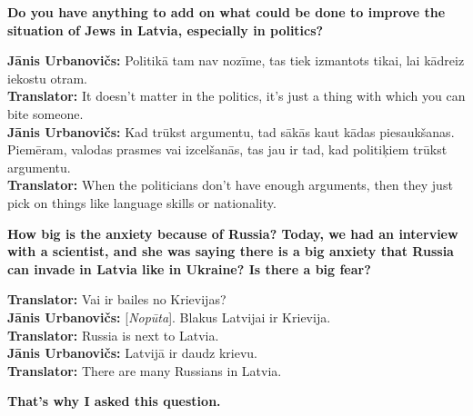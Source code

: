 \textbf{Do you have anything to add on what could be done to improve the situation of Jews in Latvia, especially in politics?}  

\textbf{Jānis Urbanovičs:} Politikā tam nav nozīme, tas tiek izmantots tikai, lai kādreiz iekostu otram.\\  
\textbf{Translator:} It doesn't matter in the politics, it’s just a thing with which you can bite someone.\\
\textbf{Jānis Urbanovičs:} Kad trūkst argumentu, tad sākās kaut kādas piesaukšanas. Piemēram, valodas prasmes vai izcelšanās, tas jau ir tad, kad politiķiem trūkst argumentu.\\ 
\textbf{Translator:} When the politicians don't have enough arguments, then they just pick on things like language skills or nationality. 

\textbf{How big is the anxiety because of Russia? Today, we had an interview with a scientist, and she was saying there is a big anxiety that Russia can invade in Latvia like in Ukraine? Is there a big fear?}  

\textbf{Translator:} Vai ir bailes no Krievijas?\\ 
\textbf{Jānis Urbanovičs:} [\textit{Nopūta}]. Blakus Latvijai ir Krievija.\\
\textbf{Translator:} Russia is next to Latvia.\\  
\textbf{Jānis Urbanovičs:} Latvijā ir daudz krievu.\\ 
\textbf{Translator:} There are many Russians in Latvia.  

\textbf{That's why I asked this question.} 

